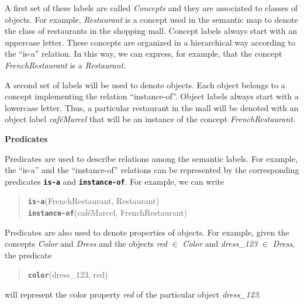 A first set of these labels are called \emph{Concepts} and they are associated to classes of objects. For example, \emph{Restaurant} is a concept used in the semantic map to denote the class of restaurants in the shopping mall. Concept labels always start with an uppercase letter.
These concepts are organized in a hierarchical way according to the ``is-a'' relation.
In this way, we can express, for example, that the concept \emph{FrenchRestaurant} is a \emph{Restaurant}. 

A second set of labels will be used to denote objects. Each object belongs to a concept implementing the relation ``instance-of''. Object labels always start with a lowercase letter.
Thus, a particular restaurant in the mall will be denoted with an object label \emph{caf\'eMarcel} that will be an instance of the concept \emph{FrenchRestaurant}. 

\vspace{1em}

\noindent 
\textbf{Predicates}

Predicates are used to describe relations among the semantic labels. For example, the ``is-a'' and the ``instance-of'' relations can be represented by the corresponding predicates {\tt\bf is-a} and {\tt\bf instance-of}. For example, we can write

\begin{quote}
{\tt\bf is-a}(FrenchRestaurant, Restaurant)\\
{\tt\bf instance-of}(caf\'eMarcel, FrenchRestaurant)\\
\end{quote}



Predicates are also used to denote properties of objects. For example, given the concepts \emph{Color} and \emph{Dress} and the objects \emph{red} $\in$ \emph{Color} and \emph{dress\_123} $\in$ \emph{Dress}, the predicate 

\begin{quote}
{\tt\bf color}(dress\_123,  red)
\end{quote}

\noindent
will represent the color property \emph{red} of the particular object  \emph{dress\_123}.




